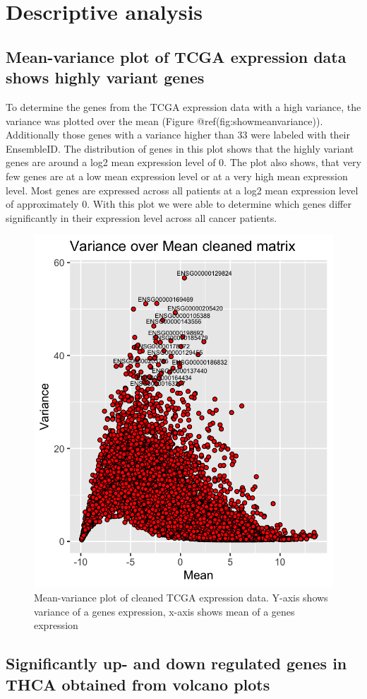 \documentclass[
  parskip,
  oneside]{scrreprt}
\begin{document}
\hypertarget{descriptive-analysis-1}{%
\section{Descriptive analysis}\label{descriptive-analysis-1}}

\hypertarget{mean-variance-plot-of-tcga-expression-data-shows-highly-variant-genes}{%
\subsection{Mean-variance plot of TCGA expression data shows highly
variant
genes}\label{mean-variance-plot-of-tcga-expression-data-shows-highly-variant-genes}}

To determine the genes from the TCGA expression data with a high
variance, the variance was plotted over the mean (Figure
@ref(fig:showmeanvariance)). Additionally those genes with a variance
higher than 33 were labeled with their EnsembleID. The distribution of
genes in this plot shows that the highly variant genes are around a log2
mean expression level of 0. The plot also shows, that very few genes are
at a low mean expression level or at a very high mean expression level.
Most genes are expressed across all patients at a log2 mean expression
level of approximately 0. With this plot we were able to determine which
genes differ significantly in their expression level across all cancer
patients.

\begin{figure}

{\centering \includegraphics[width=0.3\linewidth]{figures/Variance_over mean_cleaned_matrix} 

}

\caption{Mean-variance plot of cleaned TCGA expression data. Y-axis shows variance of a genes expression, x-axis shows mean of a genes expression}\label{fig:showmeanvariance}
\end{figure}

\hypertarget{significantly-up--and-down-regulated-genes-in-thca-obtained-from-volcano-plots}{%
\subsection{Significantly up- and down regulated genes in THCA obtained
from volcano
plots}\label{significantly-up--and-down-regulated-genes-in-thca-obtained-from-volcano-plots}}
\end{document}
